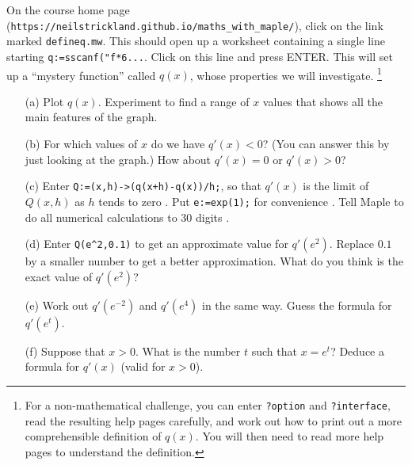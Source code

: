 \documentclass[a4paper,10pt]{amsbook}
\numberwithin{example}{chapter}
\begin{document}
\begin{exercise}\label{ex-Li}
 On the course home page
 (\verb~https://neilstrickland.github.io/maths_with_maple/~), click on
 the link marked \verb~defineq.mw~.  This should open up a worksheet 
 containing a single line starting
 \verb~q:=sscanf("f*6...~.  Click on this line and press
 ENTER.  This will set up a ``mystery function'' called
 $q(x)$, whose properties we will investigate. 
 \footnote{For a non-mathematical challenge, you can enter
  \verb~?option~ and \verb~?interface~, read the resulting help pages
  carefully, and work out how to print out a more
  comprehensible definition of $q(x)$.  You will then need
  to read more help pages to understand the definition. 
 }
 \begin{itemize}
  \item[(a)] Plot $q(x)$.  Experiment to find a range of $x$ values
   that shows all the main features of the graph. 
  \item[(b)] For which values of $x$ do we have $q'(x)<0$?  (You can
   answer this by just looking at the graph.)  How about $q'(x)=0$ or
   $q'(x)>0$? 
  \item[(c)] Enter \verb~Q:=(x,h)->(q(x+h)-q(x))/h;~, so that $q'(x)$
   is the limit of $Q(x,h)$ as $h$ tends to zero
   \note{\NOTEmultifunc}.  Put \verb~e:=exp(1);~ for
   convenience \note{\NOTEexp}.  Tell Maple to do all numerical
   calculations to 30 digits \note{\NOTEdigits}. 
  \item[(d)] Enter \verb~Q(e^2,0.1)~ to get an approximate value for
   $q'(e^2)$.  Replace $0.1$ by a smaller number to get a better
   approximation.  What do you think is the exact value of $q'(e^2)$? 
  \item[(e)] Work out $q'(e^{-2})$ and $q'(e^4)$ in the same way. 
   Guess the formula for $q'(e^t)$. 
  \item[(f)] Suppose that $x>0$.  What is the number $t$
   such that $x=e^t$?  Deduce a formula for $q'(x)$ (valid for $x>0$). 
 \end{itemize}
\end{exercise}
\end{document}
